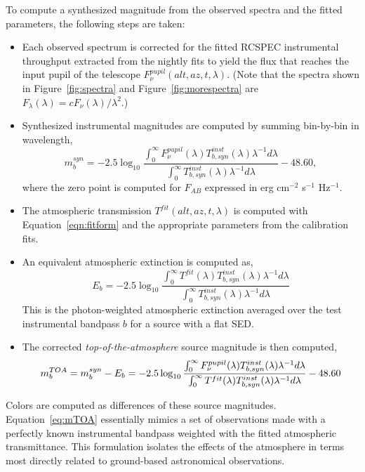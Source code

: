 \documentclass[manuscript]{aastex}
\begin{document}
To compute a synthesized magnitude from the observed spectra and the fitted parameters, the following steps are taken:
\begin{itemize}
\item Each observed spectrum is corrected for the fitted RCSPEC instrumental throughput extracted from the nightly fits to yield the flux 
that reaches the input pupil of the telescope $F_{\nu}^{pupil}(alt,az,t,\lambda)$.
(Note that the spectra shown in Figure~\ref{fig:spectra}
and Figure~\ref{fig:morespectra} are $F_{\lambda}(\lambda) = c F_\nu(\lambda)/\lambda^{2}$.)

\item Synthesized instrumental magnitudes are computed by summing bin-by-bin in wavelength,  
\begin{equation}
\label{eqn:magdef}
 m_b^{syn} = -2.5 \log_{10} \frac{ \int_0^\infty F_{\nu}^{pupil}(\lambda) T^{inst}_{b,syn}(\lambda) \lambda^{-1} d\lambda }
      {\int_0^\infty T^{inst}_{b,syn}(\lambda) \lambda^{-1} d\lambda } - 48.60, 
\end{equation}
where the zero point is computed for $F_{AB}$ expressed in erg cm$^{-2}$ s$^{-1}$ Hz$^{-1}$.

\item The atmospheric transmission $T^{fit}(alt,az,t,\lambda)$ is computed with Equation~\ref{eqn:fitform}
and the appropriate parameters from the calibration fits.

\item An equivalent atmospheric extinction is computed as,  
\begin{equation}
\label{eqn:extcmagdef}
E_b = -2.5 \log_{10} \frac{ \int_0^\infty  T^{fit}(\lambda) T^{inst}_{b,syn}(\lambda) \lambda^{-1} d\lambda }
      {\int_0^\infty T^{inst}_{b,syn}(\lambda) \lambda^{-1} d\lambda } 
\end{equation}
This is the photon-weighted atmospheric extinction averaged over the test instrumental bandpass $b$ for a source with a flat SED.

\item The corrected {\it top-of-the-atmosphere} source magnitude is then computed,
\begin{equation}
\label{eq:mTOA}
m_b^{TOA} = m_b^{syn} - E_b  \\
    = -2.5 \log_{10} \frac{ \int_0^\infty  F_{\nu}^{pupil}(\lambda) T^{inst}_{b,syn}(\lambda) \lambda^{-1} d\lambda }
      {\int_0^\infty  T^{fit}(\lambda) T^{inst}_{b,syn}(\lambda) \lambda^{-1} d\lambda } - 48.60
\end{equation}
\end{itemize}
Colors are computed as differences of these source magnitudes.
Equation~\ref{eq:mTOA} essentially mimics a set of observations made with a perfectly known instrumental bandpass weighted with
the fitted atmospheric transmittance.
This formulation isolates the effects of the atmosphere in terms most directly related to ground-based astronomical observations.
\end{document}
